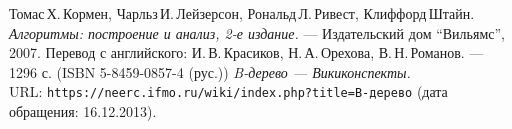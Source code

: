 \begin{thebibliography}{99}
Томас\,Х.\,Кормен, Чарльз\,И.\,Лейзерсон, Рональд\,Л.\,Ривест, Клиффорд\,Штайн.
{\itshape Алгоритмы: построение и анализ, 2-е издание.} --- Издательский дом \enquote{Вильямс}, 2007. Перевод с английского: И.\,В.\,Красиков, Н.\,А.\,Орехова, В.\,Н.\,Романов. --- 1296 с. (ISBN 5-8459-0857-4 (рус.))
{\itshape B-дерево — Викиконспекты.} \\URL: \texttt{https://neerc.ifmo.ru/wiki/index.php?title=B-дерево} (дата обращения: 16.12.2013).
\end{thebibliography}
\pagebreak


